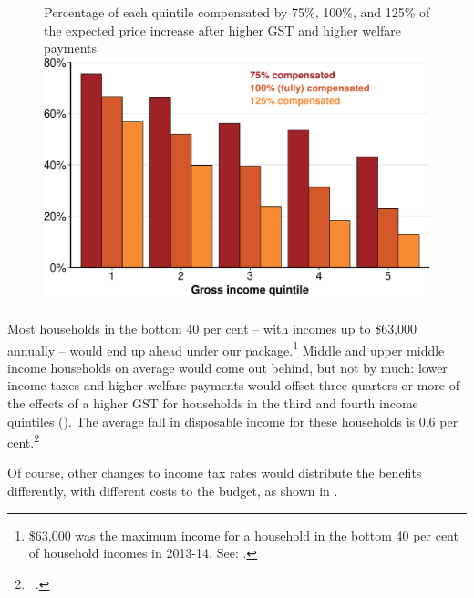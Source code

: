 \begin{figure}[p]
%
{Percentage of each quintile compensated by 75\%, 100\%, and 125\% of the expected price increase after higher GST and higher welfare payments}
\includegraphics[width=\columnwidth]{atlas/figure/GST-Figure-9-1.pdf}

\end{figure}

Most households in the bottom 40 per cent – with incomes up to \$63,000 annually – would end up ahead under our package.\footnote{\$63,000 was the maximum income for a household in the bottom 40 per cent of household incomes in 2013-14. See: \textcite{ABS2015HouseholdIncomeWealth1314}.} Middle and upper middle income households on average would come out behind, but not by much: lower income taxes and higher welfare payments would offset three quarters or more of the effects of a higher GST for households in the third and fourth income quintiles (). The average fall in disposable income for these households is 0.6 per cent.\footnote{\gao\ \textcite{ABS2013-HES-2011-12-CURF}.}  

Of course, other changes to income tax rates would distribute the benefits differently, with different costs to the budget, as shown in . 

